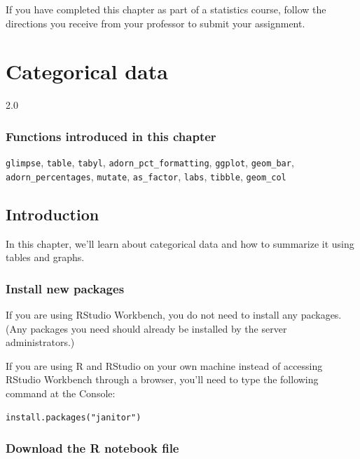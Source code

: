 \documentclass[
]{book}
\begin{document}
If you have completed this chapter as part of a statistics course, follow the directions you receive from your professor to submit your assignment.

\hypertarget{categorical}{%
\chapter{Categorical data}\label{categorical}}

2.0

\hypertarget{functions-introduced-in-this-chapter-2}{%
\subsection*{Functions introduced in this chapter}\label{functions-introduced-in-this-chapter-2}}

\texttt{glimpse}, \texttt{table}, \texttt{tabyl}, \texttt{adorn\_pct\_formatting}, \texttt{ggplot}, \texttt{geom\_bar}, \texttt{adorn\_percentages}, \texttt{mutate}, \texttt{as\_factor}, \texttt{labs}, \texttt{tibble}, \texttt{geom\_col}

\hypertarget{categorical-intro}{%
\section{Introduction}\label{categorical-intro}}

In this chapter, we'll learn about categorical data and how to summarize it using tables and graphs.

\hypertarget{cateogorical-install}{%
\subsection{Install new packages}\label{cateogorical-install}}

If you are using RStudio Workbench, you do not need to install any packages. (Any packages you need should already be installed by the server administrators.)

If you are using R and RStudio on your own machine instead of accessing RStudio Workbench through a browser, you'll need to type the following command at the Console:

\begin{verbatim}
install.packages("janitor")
\end{verbatim}

\hypertarget{categorical-download}{%
\subsection{Download the R notebook file}\label{categorical-download}}
\end{document}
